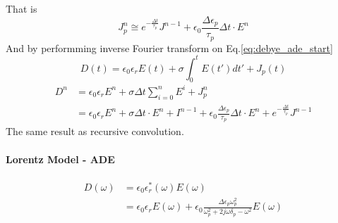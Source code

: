That is 
\begin{equation}
  J_p^n \cong e^{-\frac{\Delta t}{\tau_p}}J^{n-1} + \epsilon_0 \frac{\Delta\epsilon_p}{\tau_p}\Delta t\cdot E^n
\end{equation}
And by performming inverse Fourier transform on Eq.\ref{eq:debye_ade_start}
\begin{equation}
  D(t) = \epsilon_0\epsilon_rE(t) + \sigma \int_0^t E(t')dt' + J_p(t)
\end{equation}
\begin{equation}
  \begin{split}
    D^n & = \epsilon_0\epsilon_rE^n + \sigma\Delta t\sum_{i=0}^n E^i + J_p^n\\
    & = \epsilon_0\epsilon_rE^n + \sigma\Delta t\cdot E^n + I^{n-1} + \epsilon_0\frac{\Delta\epsilon_p}{\tau_p}\Delta t\cdot E^n + e^{-\frac{\Delta t}{\tau_p}}J^{n-1}
  \end{split}
\end{equation}
The same result as recursive convolution.






\paragraph{{\msjh Lorentz Model - ADE}}
\begin{equation}
  \begin{split}
    D(\omega) & = \epsilon_0\epsilon_r^*(\omega)E(\omega)\\
    & = \epsilon_0\epsilon_rE(\omega) + \epsilon_0 \frac{\Delta \epsilon_p \omega_p^2}{\omega_p^2+2j\omega\delta_p-\omega^2}E(\omega)
  \end{split}
\end{equation}

